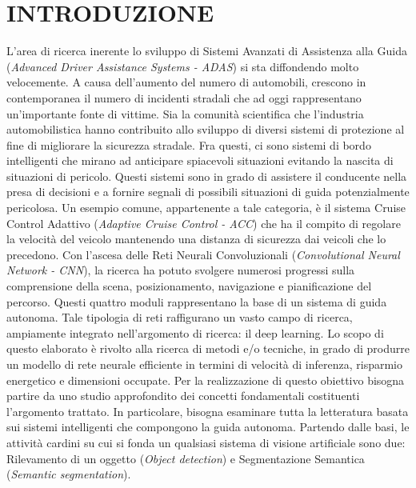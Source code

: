 
\chapter{INTRODUZIONE}
\label{Capitolo1}
\thispagestyle{empty}

L'area di ricerca inerente lo sviluppo di Sistemi Avanzati di Assistenza 
alla Guida (\emph{Advanced Driver Assistance Systems - ADAS}) si sta diffondendo 
molto velocemente. A causa dell'aumento del numero di automobili, 
crescono in contemporanea il numero di incidenti stradali che ad oggi rappresentano 
un'importante fonte di vittime. Sia la comunità scientifica che l'industria automobilistica hanno contribuito allo sviluppo di diversi sistemi di protezione al fine di migliorare la sicurezza stradale.  Fra questi, ci sono sistemi di bordo intelligenti che mirano ad anticipare spiacevoli situazioni evitando la nascita di situazioni di pericolo. Questi sistemi sono in grado di assistere il conducente nella presa di decisioni e a fornire segnali di possibili situazioni di guida potenzialmente pericolosa. Un esempio comune, appartenente a tale categoria, è il sistema Cruise Control Adattivo (\emph{Adaptive Cruise Control - ACC}) che ha il compito di regolare la velocità del veicolo mantenendo una distanza di sicurezza dai veicoli che lo precedono.
Con l'ascesa delle Reti Neurali Convoluzionali (\emph{Convolutional Neural Network - CNN}), la ricerca ha potuto svolgere numerosi progressi sulla comprensione della scena, posizionamento, navigazione e pianificazione del percorso. Questi quattro moduli rappresentano la base di un sistema di guida autonoma. Tale tipologia di reti raffigurano un vasto campo di ricerca, ampiamente integrato nell'argomento di ricerca: il deep learning. Lo scopo di questo elaborato è rivolto alla ricerca di metodi e/o tecniche, in grado di produrre un modello di rete neurale efficiente in termini di velocità di inferenza, risparmio energetico e dimensioni occupate. Per la realizzazione di questo obiettivo bisogna partire da uno studio approfondito dei concetti fondamentali costituenti l'argomento trattato. In particolare, bisogna esaminare tutta la letteratura basata sui sistemi intelligenti che compongono la guida autonoma. Partendo dalle basi, le attività cardini su cui si fonda un qualsiasi sistema di visione artificiale sono due: Rilevamento di un oggetto (\emph{Object detection}) e Segmentazione Semantica (\emph{Semantic segmentation}).
